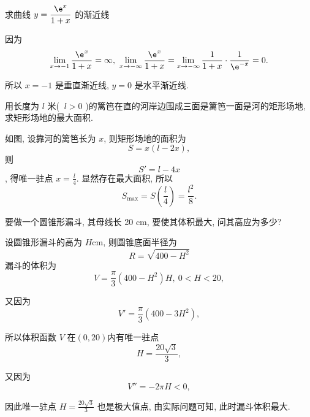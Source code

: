 \begin{problem} 求曲线 $\displaystyle y = \frac{\e^{x}}{1 + x}$ 的渐近线

\begin{solution} 因为
$$\lim\limits_{x \rightarrow - 1}\frac{\e^{x}}{1 + x} = \infty,\ \lim\limits_{x \rightarrow - \infty}\frac{\e^{x}}{1 + x} = \lim_{x \rightarrow - \infty}\frac{1}{1 + x} \cdot \frac{1}{\e^{- x}} = 0.$$

所以 $x = - 1$ 是垂直渐近线, $y = 0$ 是水平渐近线.

\end{solution}
\end{problem}





 \begin{problem} 用长度为 $l$ 米( $\ l > 0$
)的篱笆在直的河岸边围成三面是篱笆一面是河的矩形场地,
求矩形场地的最大面积.


\begin{solution}如图, 设靠河的篱笆长为 $x$, 则矩形场地的面积为
$$S = x(l - 2x),$$则
$$S' = l - 4 x$$, 得唯一驻点 $\displaystyle x = \frac{l}{4}$.
显然存在最大面积, 所以
$$S_{\max} = S\left( \frac{l}{4} \right) = \frac{l^{2}}{8}.$$
\end{solution}


\end{problem}        

  
\begin{problem} 要做一个圆锥形漏斗, 其母线长 20 cm, 要使其体积最大, 问其高应为多少?

\begin{solution} 设圆锥形漏斗的高为 $H$cm, 则圆锥底面半径为
$$R = \sqrt{400 - H^{2}}$$
漏斗的体积为
$$V = \frac{\pi}{3}\left( 400 - H^{2} \right)H,\ 0 < H < 20,$$

又因为
$$V' = \frac{\pi}{3}\left( 400 - 3H^{2} \right),$$

所以体积函数 $V$ 在$(0, 20)$内有唯一驻点
$$H = \frac{20\sqrt{3}}{3},$$

又因为
$$V'' = - 2\pi H < 0,$$

因此唯一驻点 $\displaystyle H = \frac{20\sqrt{3}}{3}$ 也是极大值点, 由实际问题可知,
此时漏斗体积最大.
\end{solution}

\end{problem}           

